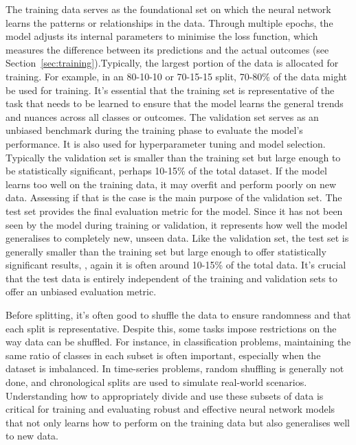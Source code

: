 The training data serves as the foundational set on which the neural network learns the patterns or relationships in the data. Through multiple epochs, the model adjusts its internal parameters to minimise the loss function, which measures the difference between its predictions and the actual outcomes (see Section~\ref{sec:training}).Typically, the largest portion of the data is allocated for training. For example, in an 80-10-10 or 70-15-15 split, 70-80\% of the data might be used for training. It's essential that the training set is representative of the task that needs to be learned to ensure that the model learns the general trends and nuances across all classes or outcomes. The validation set serves as an unbiased benchmark during the training phase to evaluate the model's performance. It is also used for hyperparameter tuning and model selection. Typically the validation set is smaller than the training set but large enough to be statistically significant, perhaps 10-15\% of the total dataset. If the model learns too well on the training data, it may overfit and perform poorly on new data. Assessing if that is the case is the main purpose of the validation set. The test set provides the final evaluation metric for the model. Since it has not been seen by the model during training or validation, it represents how well the model generalises to completely new, unseen data. Like the validation set, the test set is generally smaller than the training set but large enough to offer statistically significant results, , again it is often around 10-15\% of the total data. It's crucial that the test data is entirely independent of the training and validation sets to offer an unbiased evaluation metric.

Before splitting, it’s often good to shuffle the data to ensure randomness and that each split is representative. Despite this, some tasks impose restrictions on the way data can be shuffled. For instance, in classification problems, maintaining the same ratio of classes in each subset is often important, especially when the dataset is imbalanced. In time-series problems, random shuffling is generally not done, and chronological splits are used to simulate real-world scenarios. Understanding how to appropriately divide and use these subsets of data is critical for training and evaluating robust and effective neural network models that not only learns how to perform on the training data but also generalises well to new data.


